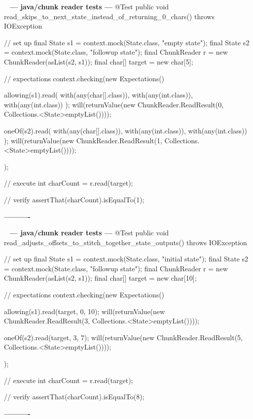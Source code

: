 \documentclass{book}
\newenvironment{chunk}[1]{%
{\ }\newline\noindent%
\hbox{\hskip 2.0cm}{\bf --- #1 ---}%
\verbatim}%                               say exactly what we see
{\endverbatim%
\par{}%
\noindent{}%
\hbox{\hskip 2.0cm}{\bf ----------}%
\par%
\normalsize\noindent}%
\begin{document}
\begin{chunk}{java/chunk reader tests}
@Test
public void read_skips_to_next_state_instead_of_returning_0_chars() throws IOException {
    // set up
    final State s1 = context.mock(State.class, "empty state");
    final State s2 = context.mock(State.class, "followup state");
    final ChunkReader r = new ChunkReader(asList(s2, s1));
    final char[] target = new char[5];

    // expectations
    context.checking(new Expectations() {{
        allowing(s1).read(
                with(any(char[].class)), 
                with(any(int.class)), 
                with(any(int.class))
        );
        will(returnValue(new ChunkReader.ReadResult(0, Collections.<State>emptyList())));

        oneOf(s2).read(
                with(any(char[].class)), 
                with(any(int.class)), 
                with(any(int.class))
        );
        will(returnValue(new ChunkReader.ReadResult(1, Collections.<State>emptyList())));
    }});

    // execute
    int charCount = r.read(target);

    // verify
    assertThat(charCount).isEqualTo(1);
}
\end{chunk}

\begin{chunk}{java/chunk reader tests}
@Test
public void read_adjusts_offsets_to_stitch_together_state_outputs() throws IOException {
    // set up
    final State s1 = context.mock(State.class, "initial state");
    final State s2 = context.mock(State.class, "followup state");
    final ChunkReader r = new ChunkReader(asList(s2, s1));
    final char[] target = new char[10];

    // expectations
    context.checking(new Expectations() {{
        allowing(s1).read(target, 0, 10);
        will(returnValue(new ChunkReader.ReadResult(3, Collections.<State>emptyList())));

        oneOf(s2).read(target, 3, 7);
        will(returnValue(new ChunkReader.ReadResult(5, Collections.<State>emptyList())));
    }});

    // execute
    int charCount = r.read(target);

    // verify
    assertThat(charCount).isEqualTo(8);
}
\end{chunk}
\end{document}
